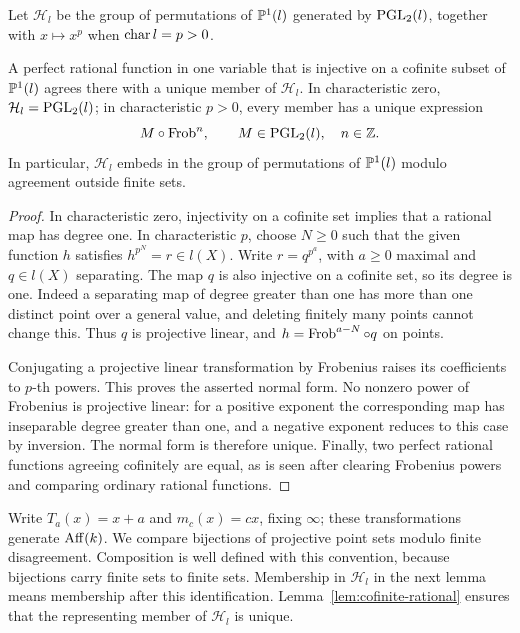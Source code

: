 Let \(\mathcal H_l\) be the group of permutations of \(\mathbb P^1(l)\) generated
by \(\operatorname{PGL}_2(l)\), together with \(x\mapsto x^p\) when \(\operatorname{char} l=p>0\).

\begin{lemma}\label{lem:cofinite-rational}
A perfect rational function in one variable that is injective on a cofinite
subset of \(\mathbb P^1(l)\) agrees there with a unique member of \(\mathcal H_l\).
In characteristic zero,
\(\mathcal H_l=\operatorname{PGL}_2(l)\); in characteristic \(p>0\), every member has a
unique expression
\[
 M\circ\operatorname{Frob}^n,\qquad M\in\operatorname{PGL}_2(l),\quad n\in\mathbb Z.
\]
In particular, \(\mathcal H_l\) embeds in the group of permutations of
\(\mathbb P^1(l)\) modulo agreement outside finite sets.
\end{lemma}

\begin{proof}
In characteristic zero, injectivity on a cofinite set implies that a
rational map has degree one.  In characteristic \(p\), choose \(N\ge0\)
such that the given function \(h\) satisfies \(h^{p^N}=r\in l(X)\).
Write \(r=q^{p^a}\), with \(a\ge0\) maximal and \(q\in l(X)\) separating.
The map \(q\) is also injective on a cofinite set, so its degree is one.
Indeed a separating map of degree greater than one has more than one
distinct point over a general value, and deleting finitely many points
cannot change this.  Thus \(q\) is projective linear, and
\(h=\operatorname{Frob}^{a-N}\circ q\) on points.

Conjugating a projective linear transformation by Frobenius raises its
coefficients to \(p\)-th powers.  This proves the asserted normal form.
No nonzero power of Frobenius is projective linear: for a positive exponent
the corresponding map has inseparable degree greater than one, and a
negative exponent reduces to this case by inversion.  The normal form is
therefore unique.  Finally, two perfect rational functions agreeing
cofinitely are equal, as is seen after clearing Frobenius powers and
comparing ordinary rational functions.
\end{proof}

Write \(T_a(x)=x+a\) and \(m_c(x)=cx\), fixing \(\infty\); these
transformations generate \(\operatorname{Aff}(k)\).  We compare bijections of projective
point sets modulo finite disagreement.  Composition is well defined with
this convention, because bijections carry finite sets to finite sets.
Membership in \(\mathcal H_l\) in the next lemma means membership after
this identification.  Lemma~\ref{lem:cofinite-rational} ensures that the
representing member of \(\mathcal H_l\) is unique.

